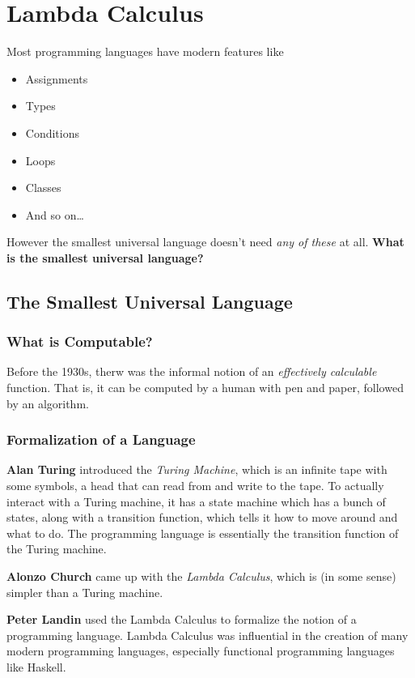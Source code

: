 \documentclass[letterpaper]{article}
\begin{document}
\section{Lambda Calculus}
Most programming languages have modern features like 
\begin{itemize}
    \item Assignments
    \item Types
    \item Conditions
    \item Loops
    \item Classes
    \item And so on\dots
\end{itemize}

However the smallest universal language doesn't need \emph{any of these} at all. \textbf{What is the smallest universal language?}

\subsection{The Smallest Universal Language}

\subsubsection{What is Computable?}
Before the 1930s, therw was the informal notion of an \emph{effectively calculable} function. That is, it can be computed by a human with pen and paper, followed by an algorithm. 

\bigskip 

\subsubsection{Formalization of a Language}
\textbf{Alan Turing} introduced the \emph{Turing Machine}, which is an infinite tape with some symbols, a head that can read from and write to the tape. To actually interact with a Turing machine, it has a state machine which has a bunch of states, along with a transition function, which tells it how to move around and what to do. The programming language is essentially the transition function of the Turing machine. 

\bigskip 

\textbf{Alonzo Church} came up with the \emph{Lambda Calculus}, which is (in some sense) simpler than a Turing machine. 

\bigskip 

\textbf{Peter Landin} used the Lambda Calculus to formalize the notion of a programming language. Lambda Calculus was influential in the creation of many modern programming languages, especially functional programming languages like Haskell. 
\end{document}
